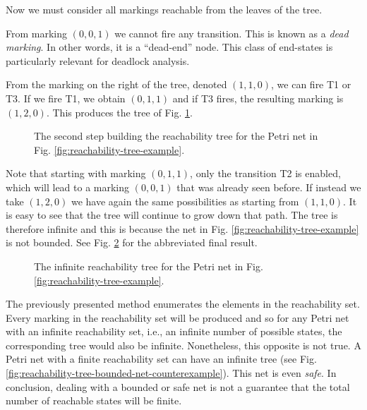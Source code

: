 Now we must consider all markings reachable from the leaves of the tree.

From marking $(0,0,1)$ we cannot fire any transition.
This is known as a \emph{dead marking}.
In other words, it is a ``dead-end'' node.
This class of end-states is particularly relevant for deadlock analysis.

From the marking on the right of the tree, denoted $(1, 1, 0)$, we can fire T1 or T3.
If we fire T1, we obtain $(0, 1, 1)$ and if T3 fires, the resulting marking is $(1, 2, 0)$.
This produces the tree of Fig. \ref{fig:reachability-tree-step-2}.

\begin{figure}[!htb]
      \centering
      
      \caption{The second step building the reachability tree
            for the Petri net in Fig. \ref{fig:reachability-tree-example}.}
      \label{fig:reachability-tree-step-2}
\end{figure}

Note that starting with marking $(0, 1, 1)$, only the transition T2 is enabled,
which will lead to a marking $(0, 0, 1)$ that was already seen before.
If instead we take $(1, 2, 0)$ we have again the same possibilities as starting from $(1, 1, 0)$.
It is easy to see that the tree will continue to grow down that path.
The tree is therefore infinite and this is because
the net in Fig. \ref{fig:reachability-tree-example} is not bounded.
See Fig. \ref{fig:reachability-tree-final-step} for the abbreviated final result.

\begin{figure}[!htb]
      \centering
      
      \caption{The infinite reachability tree for the Petri net in Fig.
            \ref{fig:reachability-tree-example}.}
      \label{fig:reachability-tree-final-step}
\end{figure}

The previously presented method enumerates the elements in the reachability set.
Every marking in the reachability set will be produced
and so for any Petri net with an infinite reachability set,
i.e., an infinite number of possible states,
the corresponding tree would also be infinite.
Nonetheless, this opposite is not true.
A Petri net with a finite reachability set can have an infinite tree
(see Fig. \ref{fig:reachability-tree-bounded-net-counterexample}).
This net is even \emph{safe}.
In conclusion, dealing with a bounded or safe net is not
a guarantee that the total number of reachable states will be finite.

